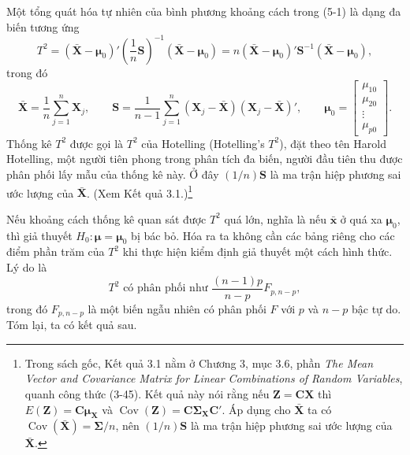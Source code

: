 Một tổng quát hóa tự nhiên của bình phương khoảng cách trong (5-1) là dạng đa
biến tương ứng
\begin{equation}
  T^2
  = (\bar{\mathbf{X}}-\boldsymbol{\mu}_0)'
    \left(\frac{1}{n}\mathbf{S}\right)^{-1}
    (\bar{\mathbf{X}}-\boldsymbol{\mu}_0)
  = n(\bar{\mathbf{X}}-\boldsymbol{\mu}_0)'
    \mathbf{S}^{-1}
    (\bar{\mathbf{X}}-\boldsymbol{\mu}_0),
\end{equation}
trong đó
\[
  \bar{\mathbf{X}} = \frac{1}{n}\sum_{j=1}^{n}\mathbf{X}_j,
  \qquad
  \mathbf{S}
  = \frac{1}{n-1}\sum_{j=1}^{n}
    (\mathbf{X}_j-\bar{\mathbf{X}})(\mathbf{X}_j-\bar{\mathbf{X}})',
  \qquad
  \boldsymbol{\mu}_0 =
  \begin{bmatrix}
    \mu_{10} \\ \mu_{20} \\ \vdots \\ \mu_{p0}
  \end{bmatrix}.
\]
Thống kê \(T^2\) được gọi là \(T^2\) của Hotelling (Hotelling's \(T^2\)), đặt theo
tên Harold Hotelling, một người tiên phong trong phân tích đa biến, người đầu tiên
thu được phân phối lấy mẫu của thống kê này. Ở đây \((1/n)\mathbf{S}\) là ma trận
hiệp phương sai ước lượng của \(\bar{\mathbf{X}}\). (Xem Kết quả 3.1.)\footnote{Trong
sách gốc, Kết quả 3.1 nằm ở Chương 3, mục 3.6, phần \textit{The Mean Vector and
Covariance Matrix for Linear Combinations of Random Variables}, quanh công thức
(3-45). Kết quả này nói rằng nếu \(\mathbf{Z}=\mathbf{C}\mathbf{X}\) thì
\(E(\mathbf{Z})=\mathbf{C}\boldsymbol{\mu}_{\mathbf{X}}\) và
\(\operatorname{Cov}(\mathbf{Z})=\mathbf{C}\boldsymbol{\Sigma}_{\mathbf{X}}\mathbf{C}'\).
Áp dụng cho \(\bar{\mathbf{X}}\) ta có
\(\operatorname{Cov}(\bar{\mathbf{X}})=\boldsymbol{\Sigma}/n\), nên
\((1/n)\mathbf{S}\) là ma trận hiệp phương sai ước lượng của
\(\bar{\mathbf{X}}\).}

Nếu khoảng cách thống kê quan sát được \(T^2\) quá lớn, nghĩa là nếu
\(\bar{\mathbf{x}}\) ở quá xa \(\boldsymbol{\mu}_0\), thì giả thuyết
\(H_0: \boldsymbol{\mu}=\boldsymbol{\mu}_0\) bị bác bỏ. Hóa ra ta không cần các
bảng riêng cho các điểm phần trăm của \(T^2\) khi thực hiện kiểm định giả thuyết
một cách hình thức. Lý do là
\begin{equation}
  T^2 \text{ có phân phối như }
  \frac{(n-1)p}{n-p}F_{p,n-p},
\end{equation}
trong đó \(F_{p,n-p}\) là một biến ngẫu nhiên có phân phối \(F\) với \(p\) và
\(n-p\) bậc tự do. Tóm lại, ta có kết quả sau.

